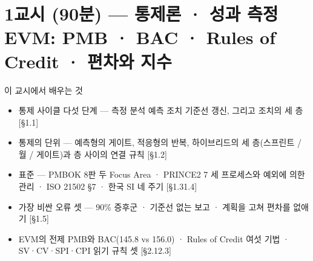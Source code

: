 \section{1교시 (90분) — 통제론 · 성과 측정 EVM: PMB · BAC · Rules of Credit · 편차와 지수}

\begin{frame}{이 교시에서 배우는 것}
\begin{itemize}
\item 통제 사이클 다섯 단계 — 측정 \ra{} 분석 \ra{} 예측 \ra{} 조치 \ra{} 기준선 갱신, 그리고 조치의 세 층 [§1.1]
\item 통제의 단위 — 예측형의 게이트, 적응형의 반복, 하이브리드의 세 층(스프린트 / 월 / 게이트)과 층 사이의 연결 규칙 [§1.2]
\item 표준 — PMBOK 8판 두 Focus Area · PRINCE2 7 세 프로세스와 예외에 의한 관리 · ISO 21502 §7 · 한국 SI 네 주기 [§1.3\til{}1.4]
\item 가장 비싼 오류 셋 — 90\% 증후군 · 기준선 없는 보고 · 계획을 고쳐 편차를 없애기 [§1.5]
\item EVM의 전제 PMB와 BAC(145.8 vs 156.0) · Rules of Credit 여섯 기법 · SV·CV·SPI·CPI 읽기 규칙 셋 [§2.1\til{}2.3]
\end{itemize}
\end{frame}

